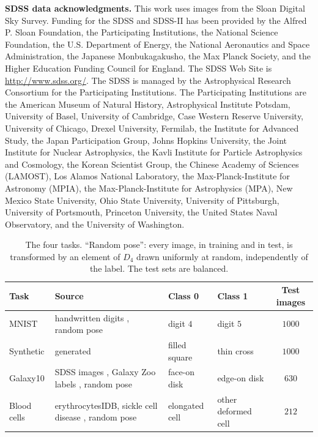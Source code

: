 \documentclass[aps,pra,reprint,superscriptaddress,longbibliography]{revtex4-2}
\begin{document}
\begin{acknowledgments}
\textbf{SDSS data acknowledgments.}
This work uses images from the Sloan Digital Sky Survey. Funding for the SDSS and SDSS-II has been provided by the Alfred P. Sloan Foundation, the Participating Institutions, the National Science Foundation, the U.S. Department of Energy, the National Aeronautics and Space Administration, the Japanese Monbukagakusho, the Max Planck Society, and the Higher Education Funding Council for England. The SDSS Web Site is \url{http://www.sdss.org/}. The SDSS is managed by the Astrophysical Research Consortium for the Participating Institutions. The Participating Institutions are the American Museum of Natural History, Astrophysical Institute Potsdam, University of Basel, University of Cambridge, Case Western Reserve University, University of Chicago, Drexel University, Fermilab, the Institute for Advanced Study, the Japan Participation Group, Johns Hopkins University, the Joint Institute for Nuclear Astrophysics, the Kavli Institute for Particle Astrophysics and Cosmology, the Korean Scientist Group, the Chinese Academy of Sciences (LAMOST), Los Alamos National Laboratory, the Max-Planck-Institute for Astronomy (MPIA), the Max-Planck-Institute for Astrophysics (MPA), New Mexico State University, Ohio State University, University of Pittsburgh, University of Portsmouth, Princeton University, the United States Naval Observatory, and the University of Washington.
\end{acknowledgments}

\appendix
\begin{table}[t]
\footnotesize
\begin{tabular*}{\textwidth}{@{\extracolsep{\fill}}llllc@{}}
\toprule
Task & Source & Class 0 & Class 1 & Test images\\
\midrule
MNIST & handwritten digits \citep{lecun1998gradient}, random pose & digit $4$ & digit $5$ & $1000$\\
Synthetic & generated & filled square & thin cross & $1000$\\
Galaxy10 & SDSS images \citep{york2000sloan}, Galaxy Zoo labels \citep{lintott2008galaxy,lintott2011galaxy,willett2013galaxy}, random pose & face-on disk & edge-on disk & $630$\\
Blood cells & erythrocytesIDB, sickle cell disease \citep{gonzalez2015red,erythrocytesidb}, random pose & elongated cell & other deformed cell & $212$\\
\bottomrule
\end{tabular*}
\caption{The four tasks. ``Random pose'': every image, in training and in test, is transformed by an element of $D_4$ drawn uniformly at random, independently of the label. The test sets are balanced.}\label{tab:tasks}
\end{table}
\end{document}
